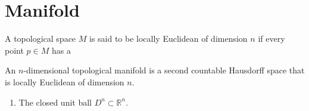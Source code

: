 \chapter{Manifold}

\begin{defbox}
    \begin{definition}
        A topological space \(M\) is said to be locally Euclidean of dimension \(n\) if every point \(p \in M\) has a 
    \end{definition}
\end{defbox}

\begin{defbox}
    \begin{definition}
        An \(n\)-dimensional topological manifold is a second countable Hausdorff space that is locally Euclidean of dimension \(n\).
    \end{definition}
\end{defbox}

\begin{example}
    \begin{enumerate}
        \item The closed unit ball \(D^n \subset \mathbb{R}^n\).
    \end{enumerate}
\end{example}
